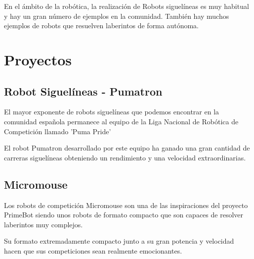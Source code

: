 
En el ámbito de la robótica, la realización de Robots siguelíneas es muy habitual y hay un gran número de ejemplos en la comunidad.
También hay muchos ejemplos de robots que resuelven laberintos de forma autónoma.


\section{Proyectos}\label{proyectos}

\subsection{Robot Siguelíneas - Pumatron}\label{siguelineas}

El mayor exponente de robots siguelíneas que podemos encontrar en la comunidad española permanece al equipo de la Liga Nacional de Robótica de Competición llamado 'Puma Pride'

El robot Pumatron desarrollado por este equipo ha ganado una gran cantidad de carreras siguelíneas obteniendo un rendimiento y una velocidad extraordinarias.

\subsection{Micromouse}\label{micromouse}

Los robots de competición Micromouse son una de las inspiraciones del proyecto PrimeBot siendo unos robots de formato compacto que son capaces de resolver laberintos muy complejos.~\cite{koza92}


Su formato extremadamente compacto junto a su gran potencia y velocidad hacen que sus competiciones sean realmente emocionantes.